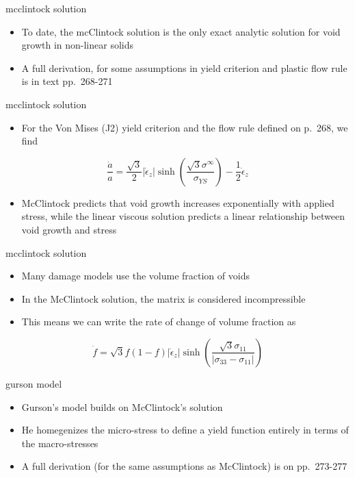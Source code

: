 \documentclass[
  letterpaper,
  ignorenonframetext,
  aspectratio=43,
  handout,
  12pt]{beamer}
\providecommand{\tightlist}{%
  \setlength{\itemsep}{0pt}\setlength{\parskip}{0pt}}
\providecommand{\tightlist}{%
\setlength{\itemsep}{0pt}\setlength{\parskip}{0pt}}
\begin{document}
\begin{frame}{mcclintock solution}
\protect\hypertarget{mcclintock-solution-1}{}
\begin{itemize}
\tightlist
\item
  To date, the mcClintock solution is the only exact analytic solution
  for void growth in non-linear solids
\item
  A full derivation, for some assumptions in yield criterion and plastic
  flow rule is in text pp.~268-271
\end{itemize}
\end{frame}

\begin{frame}{mcclintock solution}
\protect\hypertarget{mcclintock-solution-2}{}
\begin{itemize}
\tightlist
\item
  For the Von Mises (J2) yield criterion and the flow rule defined on
  p.~268, we find
\end{itemize}

\[\frac{\dot{a}}{a} = \frac{\sqrt{3}}{2}|\dot{\epsilon}_z| \sinh \left(\frac{\sqrt{3}\sigma^\infty}{\sigma_{YS}}\right) - \frac{1}{2} \dot{\epsilon}_z\]

\begin{itemize}
\tightlist
\item
  McClintock predicts that void growth increases exponentially with
  applied stress, while the linear viscous solution predicts a linear
  relationship between void growth and stress
\end{itemize}
\end{frame}

\begin{frame}{mcclintock solution}
\protect\hypertarget{mcclintock-solution-3}{}
\begin{itemize}
\tightlist
\item
  Many damage models use the volume fraction of voids
\item
  In the McClintock solution, the matrix is considered incompressible
\item
  This means we can write the rate of change of volume fraction as
\end{itemize}

\[\dot{f} = \sqrt{3} f (1-f) |\dot{\epsilon}_z|\sinh\left(\frac{\sqrt{3}\sigma_{11}}{|\sigma_{33}-\sigma_{11}|}\right)\]
\end{frame}

\begin{frame}{gurson model}
\protect\hypertarget{gurson-model}{}
\begin{itemize}
\tightlist
\item
  Gurson's model builds on McClintock's solution
\item
  He homegenizes the micro-stress to define a yield function entirely in
  terms of the macro-stresses
\item
  A full derivation (for the same assumptions as McClintock) is on
  pp.~273-277
\end{itemize}
\end{frame}
\end{document}
